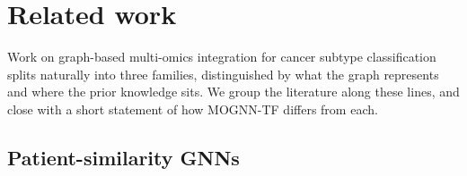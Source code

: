 \documentclass[review,3p,times,11pt, ]{elsarticle} %
\begin{document}

\section{Related work}
\label{sec:related_work}

Work on graph-based multi-omics integration for cancer subtype classification
splits naturally into three families, distinguished by what the graph
represents and where the prior knowledge sits. We group the literature along
these lines, and close with a short statement of how MOGNN-TF differs from
each.

\subsection{Patient-similarity GNNs}
\label{ssec:rw_psn}
\end{document}
